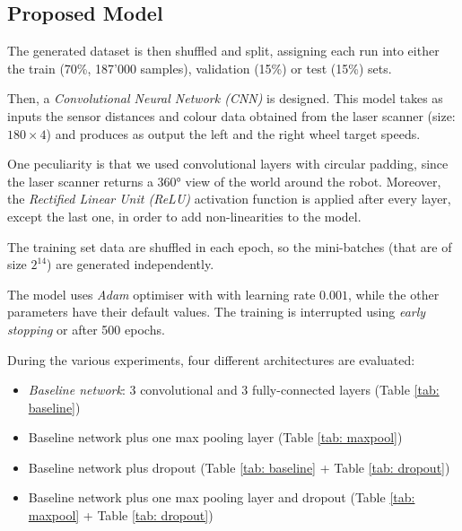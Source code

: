 \subsection{Proposed Model}
The generated dataset is then shuffled and split, assigning each run into either
the train (70\%, 187'000 samples), validation (15\%) or test (15\%) sets.

Then, a \emph{Convolutional Neural Network (CNN)} is designed. This model takes 
as inputs the sensor distances and colour data obtained from the laser scanner 
(size: $180 \times 4$) and produces as output the left and the right wheel 
target speeds. 

One peculiarity is that we used convolutional layers with circular padding, 
since the laser scanner returns a 360° view of the world around the robot.
Moreover, the \emph{Rectified Linear Unit (ReLU)} activation function is 
applied after every layer, except the last one, in order to add non-linearities 
to the model. 

The training set data are shuffled in each epoch, so the mini-batches (that are 
of size $2^{14}$) are generated independently. 

The model uses \emph{Adam} optimiser with with learning rate $0.001$, while the 
other parameters have their default values. The training is interrupted using 
\emph{early stopping} or after 500 epochs. 

During the various experiments, four different architectures are evaluated:
\begin{itemize}
	\item \emph{Baseline network}: 3 convolutional and 3 fully-connected
	layers (Table \ref{tab: baseline})
	\item Baseline network plus one max pooling layer (Table \ref{tab: maxpool})
	\item Baseline network plus dropout (Table \ref{tab: baseline} + Table 
	\ref{tab: dropout})
	\item Baseline network plus one max pooling layer and dropout (Table 
	\ref{tab: maxpool} + Table \ref{tab: dropout})
\end{itemize} 

